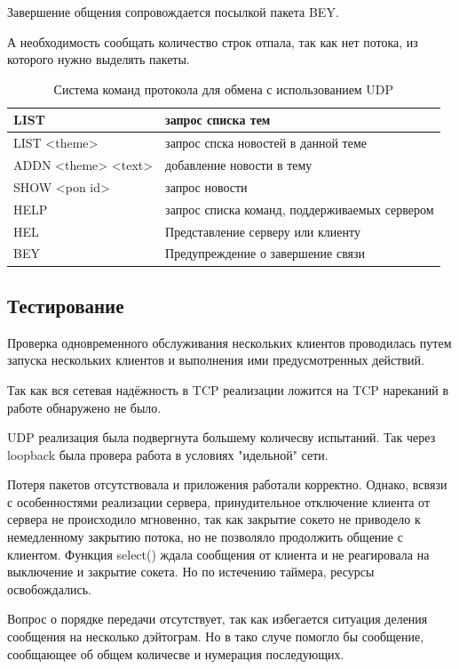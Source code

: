 \documentclass[a4paper]{article}
\begin{document}
Завершение общения сопровождается посылкой пакета BEY.

А необходимость сообщать количество строк отпала, так как нет потока, из которого нужно выделять пакеты.
\begin{table}[H]
\begin{center}
\caption{Система команд протокола для обмена с использованием UDP}
\label{tabular:UDPstruct}
\begin{tabular}{|l|l|}
\hline
LIST & запрос списка тем\\ \hline
LIST <theme> & запрос спска новостей в данной теме\\ \hline
ADDN <theme> <text> & добавление новости в тему\\ \hline
SHOW <pon id> & запрос новости\\ \hline
HELP & запрос списка команд, поддерживаемых сервером\\ \hline
HEL & Представление серверу или клиенту\\ \hline
BEY & Предупреждение о завершение связи\\ \hline
\end{tabular}
\end{center}
\end{table}
\subsection{Тестирование}
Проверка одновременного обслуживания нескольких клиентов проводилась путем запуска нескольких клиентов и выполнения ими предусмотренных действий.

Так как вся сетевая надёжность в TCP реализации ложится на TCP нареканий в работе обнаружено не было.

UDP реализация была подвергнута большему количесву испытаний. Так через loopback была провера работа в условиях "идельной" сети. 

Потеря пакетов отсутствовала и приложения работали корректно. Однако, всвязи с особенностями реализации сервера, принудительное отключение клиента от сервера не происходило мгновенно, так как закрытие сокето не приводело к немедленному закрытию потока, но не позволяло продолжить общение с клиентом. Функция select() ждала сообщения от клиента и не реагировала на выключение и закрытие сокета. Но по истечению таймера, ресурсы освобождались.

Вопрос о порядке передачи отсутствует, так как избегается ситуация деления сообщения на несколько дэйтограм. Но в тако случе помогло бы сообщение, сообщающее об общем количесве и нумерация последующих.
\end{document}
